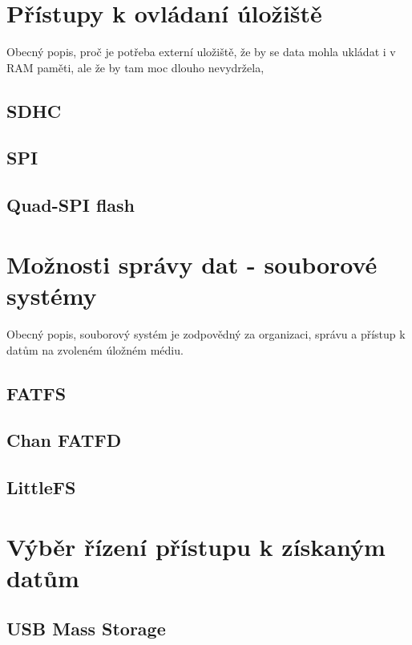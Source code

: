 \section{Přístupy k ovládaní úložiště}
Obecný popis, proč je potřeba externí uložiště, že by se data mohla ukládat i v RAM paměti, ale že by tam moc dlouho nevydržela, 

\subsection{SDHC}

\subsection{SPI}

\subsection{Quad-SPI flash}


\section{Možnosti správy dat - souborové systémy} 
Obecný popis, souborový systém je zodpovědný za organizaci, správu a přístup k datům na zvoleném úložném médiu.

\subsection{FATFS}

\subsection{Chan FATFD}

\subsection{LittleFS}



\section{Výběr řízení přístupu k získaným datům}

\subsection{USB Mass Storage}

